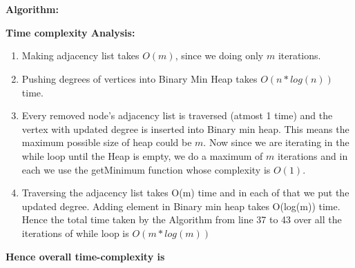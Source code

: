 \documentclass{article}
\begin{document}
\\\\
\textbf{Algorithm:}

\textbf{Time complexity Analysis:}
\begin{enumerate}
    \item Making adjacency list takes $O(m)$, since we doing only $m$ iterations.
    \item Pushing degrees of vertices into Binary Min Heap takes $O(n*log(n))$ time.
    \item Every removed node's adjacency list is traversed (atmost 1 time) and the vertex with updated degree is inserted into Binary min heap. This means the maximum possible size of heap could be $m$. Now since we are iterating in the while loop until the Heap is empty, we do a maximum of $m$ iterations and in each we use the getMinimum function whose complexity is $O(1)$.
    \item Traversing the adjacency list takes O(m) time and in each of that we put the updated degree. Adding element in Binary min heap takes O(log(m)) time. Hence the total time taken by the Algorithm from line 37 to 43 over all the iterations of while loop is $O(m*log(m))$
\end{enumerate}
\textbf{Hence overall time-complexity is }

\subsection{}
\end{document}
